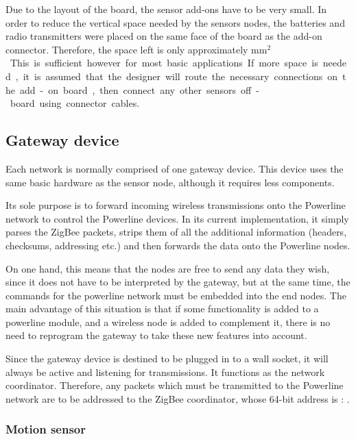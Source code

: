 Due to the layout of the board, the sensor add-ons have to be very small. In
order to reduce the vertical space needed by the sensors nodes, the batteries
and radio transmitters were placed on the same face of the board as the add-on
connector. Therefore, the space left is only approximately \unit[25x25]{mm$^2$}.
This is sufficient however for most basic applications. If more space is needed,
it is assumed that the designer will route the necessary connections on the
add-on board, then connect any other sensors off-board using connector cables.


\subsection{Gateway device}

Each network is normally comprised of one gateway device. This device uses the
same basic hardware as the sensor node, although it requires less components.


Its sole purpose is to forward incoming wireless transmissions onto the
Powerline network to control the Powerline devices. In its current
implementation, it simply parses the ZigBee packets, strips them of all the
additional information (headers, checksums, addressing etc.) and then forwards
the data onto the Powerline nodes.

On one hand, this means that the nodes are free to send any data they wish,
since it does not have to be interpreted by the gateway, but at the same time,
the commands for the powerline network must be embedded into the end nodes. The
main advantage of this situation is that if some functionality is added to a
powerline module, and a wireless node is added to complement it, there is no
need to reprogram the gateway to take these new features into account.

Since the gateway device is destined to be plugged in to a wall socket, it will
always be active and listening for transmissions. It functions as the network
coordinator. Therefore, any packets which must be transmitted to the Powerline
network are to be addressed to the ZigBee coordinator, whose 64-bit address is :
.

\subsubsection{Motion sensor}

